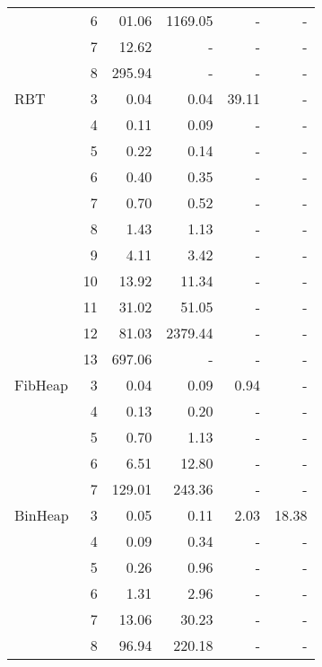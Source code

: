 \begin{table}
\begin{tabular}{ l r | r | r | r | r  }
&	6	&	01.06	&	1169.05	&	-	&	-	\\
&	7	&	12.62	&	-	&	-	&	-	\\
&	8	&	295.94	&	-	&	-	&	-	\\
  \midrule
  RBT
&	3	&	0.04	&	0.04	&	39.11	&	-	\\
&	4	&	0.11	&	0.09	&	-	&	-	\\
&	5	&	0.22	&	0.14	&	-	&	-	\\
&	6	&	0.40	&	0.35	&	-	&	-	\\
&	7	&	0.70	&	0.52	&	-	&	-	\\
&	8	&	1.43	&	1.13	&	-	&	-	\\
&	9	&	4.11	&	3.42	&	-	&	-	\\
&	10	&	13.92	&	11.34	&	-	&	-	\\
&	11	&	31.02	&	51.05	&	-	&	-	\\
&	12	&	81.03	&	2379.44	&	-	&	-	\\
&	13	&	697.06	&	-	&	-	&	-	\\
  \midrule
  FibHeap
&	3	&	0.04	&	0.09	&	0.94	&	-	\\
&	4	&	0.13	&	0.20	&	-	&	-	\\
&	5	&	0.70	&	1.13	&	-	&	-	\\
&	6	&	6.51	&	12.80	&	-	&	-	\\
&	7	&	129.01	&	243.36	&	-	&	-	\\
  \midrule
  BinHeap
&	3	&	0.05	&	0.11	&	2.03	&	18.38	\\
&	4	&	0.09	&	0.34	&	-	&	-	\\
&	5	&	0.26	&	0.96	&	-	&	-	\\
&	6	&	1.31	&	2.96	&	-	&	-	\\
&	7	&	13.06	&	30.23	&	-	&	-	\\
&	8	&	96.94	&	220.18	&	-	&	-	\\
  \bottomrule
\end{tabular}
\end{table}
\vspace{0.3cm}
